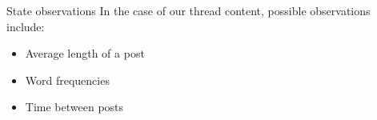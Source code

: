 \documentclass[compress]{beamer}
\begin{document}
\begin{frame}{State observations}
In the case of our thread content, possible observations include:
\begin{itemize}
	\item Average length of a post
	\item Word frequencies
	\item Time between posts
\end{itemize}
\end{frame}







\end{document}
